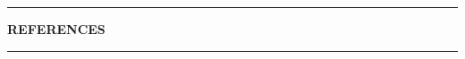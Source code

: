 \documentclass[12pt, a4paper, openright]{report}
\begin{document}
\appendix


\clearpage

\begin{center}
  {\color{StarGold}\rule{0.4\textwidth}{0.5pt}}
\end{center}
\vspace{0.8cm}
{\centering\Large\bfseries\color{DeepSpace}REFERENCES\par}
\vspace{0.8cm}
\begin{center}
  {\color{StarGold}\rule{0.4\textwidth}{0.5pt}}
\end{center}
\vspace{1.2cm}

\nocite{*}
\label{bibliography}
\printbibliography[heading=none]

\end{document}
